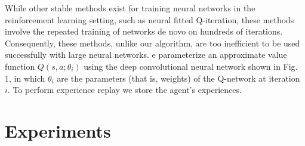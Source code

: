 \documentclass[letterpaper]{article}
\begin{document}
While other stable methods exist for training neural networks in the reinforcement learning setting, such as neural fitted Q-iteration, these methods involve the repeated training of networks de novo on hundreds of iterations. Consequently, these methods, unlike our algorithm, are too inefficient to be used successfully with large neural networks. e parameterize an approximate value function $Q(s,a;\theta_i)$ using the deep convolutional neural network shown in Fig. 1, in which $\theta_i$ are the parameters (that is, weights) of the Q-network at iteration $i$. To perform experience replay we store the agent's experiences.

\section{Experiments}

\newpage


\end{document}
